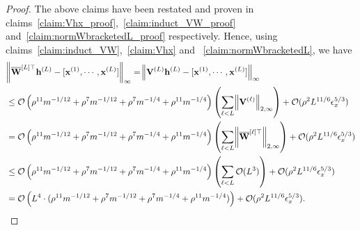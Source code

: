 \begin{proof}
	
	The above claims have been restated and proven in claims~\ref{claim:Vhx_proof},~\ref{claim:induct_VW_proof} and~\ref{claim:normWbracketedL_proof} respectively. Hence, using claims~\ref{claim:induct_VW},~\ref{claim:Vhx} and ~\ref{claim:normWbracketedL}, we have
	\begingroup \allowdisplaybreaks
	\begin{align*} 
		&\norm{ \overline{\mathbf{W}}^{[L]\top}  \mathbf{h}^{(L)} - [\mathbf{x}^{(1)}, \cdots,  \mathbf{x}^{(L)}]}_\infty =  \norm{ \mathbf{V}^{(L)}  \mathbf{h}^{(L)} - [\mathbf{x}^{(1)}, \cdots,  \mathbf{x}^{(L)}]}_\infty \\& 
		\le \mathcal{O}\left(\rho^{11} m^{-1/12} + \rho^{7} m^{-1/12} + \rho^{7} m^{-1/4} + \rho^{11} m^{-1/4}  \right)  \left( \sum_{\ell < L} \norm{\mathbf{V}^{(\ell)}}_{2, \infty}\right) + \mathcal{O}(\rho^2 L^{11/6} \epsilon_x^{5/3}) \\& 
		= \mathcal{O}\left(\rho^{11} m^{-1/12} + \rho^{7} m^{-1/12} + \rho^{7} m^{-1/4} + \rho^{11} m^{-1/4}  \right)  \left( \sum_{\ell < L} \norm{\overline{\mathbf{W}}^{[\ell]\top}}_{2, \infty}\right) + \mathcal{O}(\rho^2 L^{11/6} \epsilon_x^{5/3})\\& 
		\le \mathcal{O}\left(\rho^{11} m^{-1/12} + \rho^{7} m^{-1/12} + \rho^{7} m^{-1/4} + \rho^{11} m^{-1/4}  \right)  \left( \sum_{\ell < L} \mathcal{O}(L^3)\right) + \mathcal{O}(\rho^2 L^{11/6} \epsilon_x^{5/3}) \\& = \mathcal{O}\left(L^4 \cdot (\rho^{11} m^{-1/12} + \rho^{7} m^{-1/12} + \rho^{7} m^{-1/4} + \rho^{11} m^{-1/4} ) \right)  + \mathcal{O}(\rho^2 L^{11/6} \epsilon_x^{5/3}).
	\end{align*}
	\endgroup
	
\end{proof}




